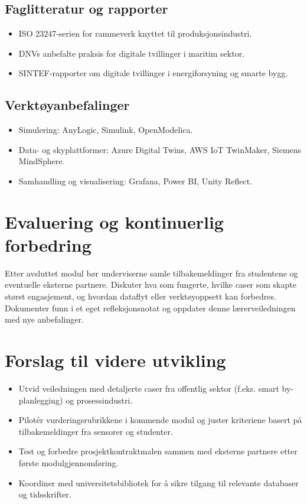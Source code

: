 \subsection{Faglitteratur og rapporter}
\begin{itemize}
    \item ISO 23247-serien for rammeverk knyttet til produksjonsindustri.
    \item DNVs anbefalte praksis for digitale tvillinger i maritim sektor.
    \item SINTEF-rapporter om digitale tvillinger i energiforsyning og smarte bygg.
\end{itemize}

\subsection{Verktøyanbefalinger}
\begin{itemize}
    \item Simulering: AnyLogic, Simulink, OpenModelica.
    \item Data- og skyplattformer: Azure Digital Twins, AWS IoT TwinMaker, Siemens MindSphere.
    \item Samhandling og visualisering: Grafana, Power BI, Unity Reflect.
\end{itemize}

\section{Evaluering og kontinuerlig forbedring}
Etter avsluttet modul bør underviserne samle tilbakemeldinger fra studentene og eventuelle eksterne partnere. Diskuter hva som fungerte, hvilke caser som skapte størst engasjement, og hvordan dataflyt eller verktøyoppsett kan forbedres. Dokumenter funn i et eget refleksjonsnotat og oppdater denne lærerveiledningen med nye anbefalinger.

\section{Forslag til videre utvikling}
\begin{itemize}
    \item Utvid veiledningen med detaljerte caser fra offentlig sektor (f.eks. smart by-planlegging) og prosessindustri.
    \item Pilotér vurderingsrubrikkene i kommende modul og juster kriteriene basert på tilbakemeldinger fra sensorer og studenter.
    \item Test og forbedre prosjektkontraktmalen sammen med eksterne partnere etter første modulgjennomføring.
    \item Koordiner med universitetsbibliotek for å sikre tilgang til relevante databaser og tidsskrifter.
\end{itemize}


